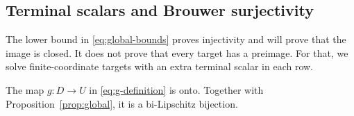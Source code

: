 \subsection{Terminal scalars and Brouwer surjectivity}

The lower bound in \eqref{eq:global-bounds} proves injectivity and will prove that the
image is closed. It does not prove that every target has a preimage.
For that, we solve finite-coordinate targets with an extra terminal
scalar in each row.

\begin{proposition}\label{prop:onto}
The map \(g:D\to U\) in \eqref{eq:g-definition} is onto. Together with
Proposition~\ref{prop:global}, it is a bi-Lipschitz bijection.
\end{proposition}

